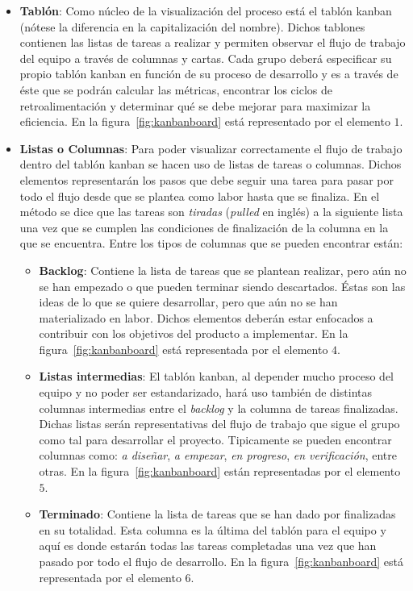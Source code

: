 \begin{itemize}
    \item \textbf{Tablón}: %
    Como núcleo de la visualización del proceso está el tablón kanban (nótese la
    diferencia en la capitalización del nombre). Dichos tablones contienen las
    listas de tareas a realizar y permiten observar el flujo de trabajo del
    equipo a través de columnas y cartas. Cada grupo deberá especificar su
    propio tablón kanban en función de su proceso de desarrollo y es a través de
    éste que se podrán calcular las métricas, encontrar los ciclos de
    retroalimentación y determinar qué se debe mejorar para maximizar la
    eficiencia. En la figura~\ref{fig:kanbanboard} está representado por el
    elemento $1$.

    \item \textbf{Listas o Columnas}:
    Para poder visualizar correctamente el flujo de trabajo dentro del tablón
    kanban se hacen uso de listas de tareas o columnas. Dichos elementos
    representarán los pasos que debe seguir una tarea para pasar por todo el
    flujo desde que se plantea como labor hasta que se finaliza. En el método se
    dice que las tareas son \emph{tiradas} (\emph{pulled} en inglés) a la
    siguiente lista una vez que se cumplen las condiciones de finalización de la
    columna en la que se encuentra. Entre los tipos de columnas que se pueden
    encontrar están:
    \begin{itemize}
        \item \textbf{Backlog}: Contiene la lista de tareas que se plantean
        realizar, pero aún no se han empezado o que pueden terminar siendo
        descartados. Éstas son las ideas de lo que se quiere desarrollar, pero
        que aún no se han materializado en labor. Dichos elementos deberán estar
        enfocados a contribuir con los objetivos del producto a implementar. En
        la figura~\ref{fig:kanbanboard} está representada por el elemento $4$.
        \item \textbf{Listas intermedias}: El tablón kanban, al depender mucho
        proceso del equipo y no poder ser estandarizado, hará uso también de
        distintas columnas intermedias entre el \emph{backlog} y la columna de
        tareas finalizadas. Dichas listas serán representativas del flujo de
        trabajo que sigue el grupo como tal para desarrollar el proyecto.
        Tipicamente se pueden encontrar columnas como: \emph{a diseñar}, \emph{a
        empezar}, \emph{en progreso}, \emph{en verificación}, entre otras. En la
        figura~\ref{fig:kanbanboard} están representadas por el elemento $5$.
        \item \textbf{Terminado}: Contiene la lista de tareas que se han dado
        por finalizadas en su totalidad. Esta columna es la última del tablón
        para el equipo y aquí es donde estarán todas las tareas completadas una
        vez que han pasado por todo el flujo de desarrollo. En la
        figura~\ref{fig:kanbanboard} está representada por el elemento $6$.
    \end{itemize}


\end{itemize}
